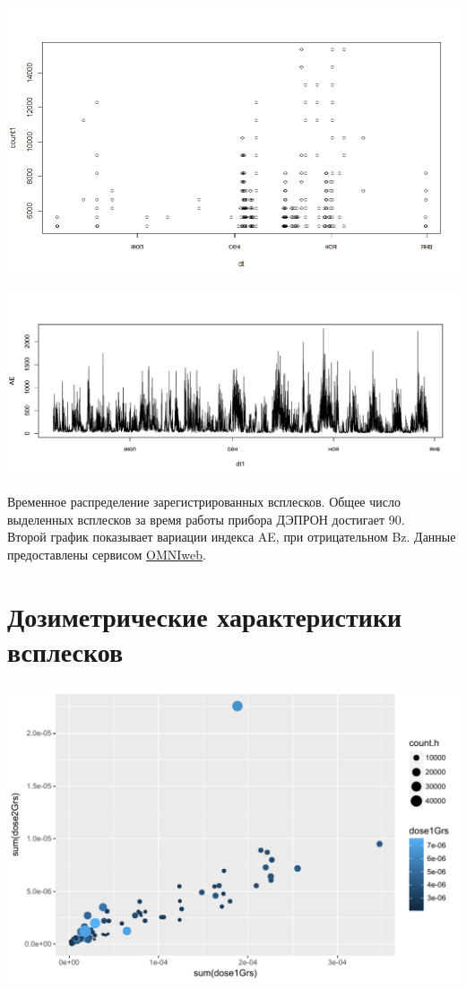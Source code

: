 \documentclass[t, aspectratio=43]{beamer}
\begin{document}
\begin{frame}	
\frametitle{\insertsection} 
\centering

\includegraphics[width=0.7\linewidth, trim={0 2cm 0 0}, clip]{images/Flash/Rplot03.png}

\includegraphics[width=0.7\linewidth, trim={0 1.5cm 0 1cm}, clip]{images/Flash/Rplot01}

\tiny{Временное распределение зарегистрированных всплесков. Общее число выделенных всплесков за время работы прибора ДЭПРОН достигает 90.\\ Второй график показывает вариации индекса AE, при отрицательном Bz. Данные предоставлены сервисом  \href{https://omniweb.gsfc.nasa.gov/}{OMNIweb}.}

\end{frame}
\section{Дозиметрические характеристики всплесков}

\begin{frame}	
\frametitle{\insertsection} 
\begin{center}
	\includegraphics[width=1\linewidth]{images/dose2vsdose1}
\end{center}


\end{frame}
\end{document}

